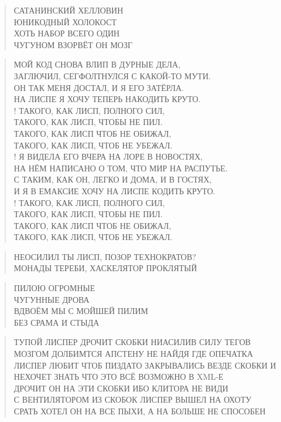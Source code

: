 \poemtitle{***}
\begin{verse}
САТАНИНСКИЙ ХЕЛЛОВИН\\
ЮНИКОДНЫЙ ХОЛОКОСТ\\
ХОТЬ НАБОР ВСЕГО ОДИН\\
ЧУГУНОМ ВЗОРВЁТ ОН МОЗГ
\end{verse}

\poemtitle{***}
\begin{verse}
МОЙ КОД СНОВА ВЛИП В ДУРНЫЕ ДЕЛА,\\
ЗАГЛЮЧИЛ, СЕГФОЛТНУЛСЯ С КАКОЙ-ТО МУТИ.\\
ОН ТАК МЕНЯ ДОСТАЛ, И Я ЕГО ЗАТЁРЛА.\\
НА ЛИСПЕ Я ХОЧУ ТЕПЕРЬ НАКОДИТЬ КРУТО.\\!
ТАКОГО, КАК ЛИСП, ПОЛНОГО СИЛ,\\
ТАКОГО, КАК ЛИСП, ЧТОБЫ НЕ ПИЛ.\\
ТАКОГО, КАК ЛИСП ЧТОБ НЕ ОБИЖАЛ,\\
ТАКОГО, КАК ЛИСП, ЧТОБ НЕ УБЕЖАЛ.\\!
Я ВИДЕЛА ЕГО ВЧЕРА НА ЛОРЕ В НОВОСТЯХ,\\
НА НЁМ НАПИСАНО О ТОМ, ЧТО МИР НА РАСПУТЬЕ.\\
С ТАКИМ, КАК ОН, ЛЕГКО И ДОМА, И В ГОСТЯХ,\\
И Я В ЕМАКСИЕ ХОЧУ НА ЛИСПЕ КОДИТЬ КРУТО.\\!
ТАКОГО, КАК ЛИСП, ПОЛНОГО СИЛ,\\
ТАКОГО, КАК ЛИСП, ЧТОБЫ НЕ ПИЛ.\\
ТАКОГО, КАК ЛИСП ЧТОБ НЕ ОБИЖАЛ,\\
ТАКОГО, КАК ЛИСП, ЧТОБ НЕ УБЕЖАЛ.
\end{verse}

\poemtitle{***}
\begin{verse}
НЕОСИЛИЛ ТЫ ЛИСП, ПОЗОР ТЕХНОКРАТОВ?\\
МОНАДЫ ТЕРЕБИ, ХАСКЕЛЯТОР ПРОКЛЯТЫЙ
\end{verse}

\poemtitle{***}
\begin{verse}
ПИЛОЮ ОГРОМНЫЕ\\
ЧУГУННЫЕ ДРОВА\\
ВДВОЁМ МЫ С МОЙШЕЙ ПИЛИМ\\
БЕЗ СРАМА И СТЫДА
\end{verse}

\poemtitle{***}
\begin{verse}
ТУПОЙ ЛИСПЕР ДРОЧИТ СКОБКИ НИАСИЛИВ СИЛУ ТЕГОВ\\
МОЗГОМ ДОЛБИМТСЯ АПСТЕНУ НЕ НАЙДЯ ГДЕ ОПЕЧАТКА\\
ЛИСПЕР ЛЮБИТ ЧТОБ ПИЗДАТО ЗАКРЫВАЛИСЬ ВЕЗДЕ СКОБКИ И НЕХОЧЕТ ЗНАТЬ ЧТО ЭТО ВСЁ ВОЗМОЖНО В XML-Е\\
ДРОЧИТ ОН НА ЭТИ СКОБКИ ИБО КЛИТОРА НЕ ВИДИ\\
С ВЕНТИЛЯТОРОМ ИЗ СКОБОК ЛИСПЕР ВЫШЕЛ НА ОХОТУ\\
СРАТЬ ХОТЕЛ ОН НА ВСЕ ПЫХИ, А НА БОЛЬШЕ НЕ СПОСОБЕН
\end{verse}

